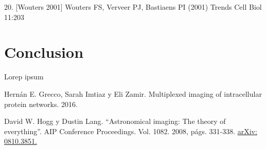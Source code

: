 \documentclass{ctuthesis}
\begin{document}
20. [Wouters 2001] Wouters FS, Verveer PJ, Bastiaens PI (2001) Trends Cell Biol 11:203
\chapter{Conclusion}

Lorep ipsum \cite{doe}

\begin{thebibliography}{1}

 Hernán E. Grecco, Sarah Imtiaz y Eli Zamir. Multiplexed
imaging of intracellular protein networks. 2016.

 David W. Hogg y Dustin Lang. “Astronomical imaging: The
	theory of everything”. AIP Conference Proceedings. Vol. 1082.
	2008, págs. 331-338. \href{https://arxiv.org/pdf/0810.3851.pdf}{arXiv: 
	0810.3851.}

\end{thebibliography}
\end{document}
